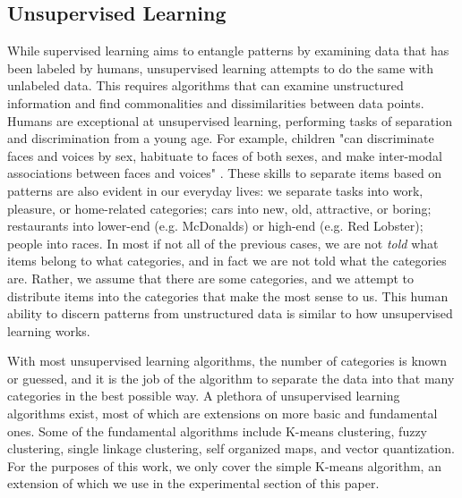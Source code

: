 \subsection{Unsupervised Learning}
While supervised learning aims to entangle patterns by examining data that has been labeled by humans, unsupervised learning attempts to do the same with unlabeled data. This requires algorithms that can examine unstructured information and find commonalities and dissimilarities between data points. Humans are exceptional at unsupervised learning, performing tasks of separation and discrimination from a young age. For example, children "can discriminate faces and voices by sex, habituate to faces of both sexes, and make inter-modal associations between faces and voices" \cite{martin2010patterns}. These skills to separate items based on patterns are also evident in our everyday lives: we separate tasks into work, pleasure, or home-related categories; cars into new, old, attractive, or boring; restaurants into lower-end (e.g. McDonalds) or high-end (e.g. Red Lobster); people into races. In most if not all of the previous cases, we are not \textit{told} what items belong to what categories, and in fact we are not told what the categories are. Rather, we assume that there are some categories, and we attempt to distribute items into the categories that make the most sense to us. This human ability to discern patterns from unstructured data is similar to how unsupervised learning works.

With most unsupervised learning algorithms, the number of categories is known or guessed, and it is the job of the algorithm to separate the data into that many categories in the best possible way. A plethora of unsupervised learning algorithms exist, most of which are extensions on more basic and fundamental ones. Some of the fundamental algorithms include K-means clustering, fuzzy clustering, single linkage clustering, self organized maps, and vector quantization. For the purposes of this work, we only cover the simple K-means algorithm, an extension of which we use in the experimental section of this paper.

